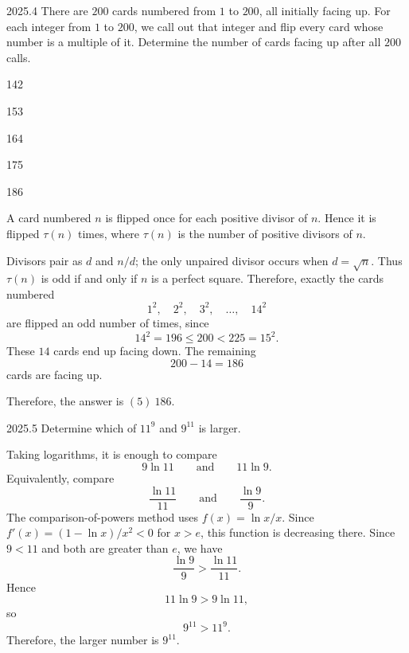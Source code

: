     \begin{pastproblem}{2025.4}
        There are $200$ cards numbered from $1$ to $200$, all initially facing up. For each integer
        from $1$ to $200$, we call out that integer and flip every card whose number is a multiple
        of it. Determine the number of cards facing up after all $200$ calls.
        \begin{problemchoices}
            \item 142
            \item 153
            \item 164
            \item 175
            \item 186
        \end{problemchoices}
    \end{pastproblem}

    \begin{solution}
        A card numbered $n$ is flipped once for each positive divisor of $n$. Hence it is flipped
        $\tau(n)$ times, where $\tau(n)$ is the number of positive divisors of $n$.

        Divisors pair as $d$ and $n/d$; the only unpaired divisor occurs when $d=\sqrt n$. Thus $\tau(n)$ is odd if and only if $n$ is a perfect square. Therefore, exactly the cards numbered
        \[
            1^2,\quad 2^2,\quad 3^2,\quad \ldots,\quad 14^2
        \]
        are flipped an odd number of times, since
        \[
            14^2=196\leq 200<225=15^2.
        \]
        These $14$ cards end up facing down. The remaining
        \[
            200-14=186
        \]
        cards are facing up.

        Therefore, the answer is $\boxed{(5)\ 186}$.
    \end{solution}

    \begin{pastproblem}{2025.5}
        Determine which of $11^9$ and $9^{11}$ is larger.
    \end{pastproblem}

    \begin{solution}
        Taking logarithms, it is enough to compare
        \[
            9\ln 11
            \qquad\text{and}\qquad
            11\ln 9.
        \]
        Equivalently, compare
        \[
            \frac{\ln 11}{11}
            \qquad\text{and}\qquad
            \frac{\ln 9}{9}.
        \]
        The comparison-of-powers method uses $f(x)=\ln x/x$. Since $f'(x)=(1-\ln x)/x^2<0$ for $x>e$, this function is decreasing there. Since $9<11$ and both are greater than
        $e$, we have
        \[
            \frac{\ln 9}{9}
            >
            \frac{\ln 11}{11}.
        \]
        Hence
        \[
            11\ln 9>9\ln 11,
        \]
        so
        \[
            9^{11}>11^9.
        \]
        Therefore, the larger number is $\boxed{9^{11}}$.
    \end{solution}

